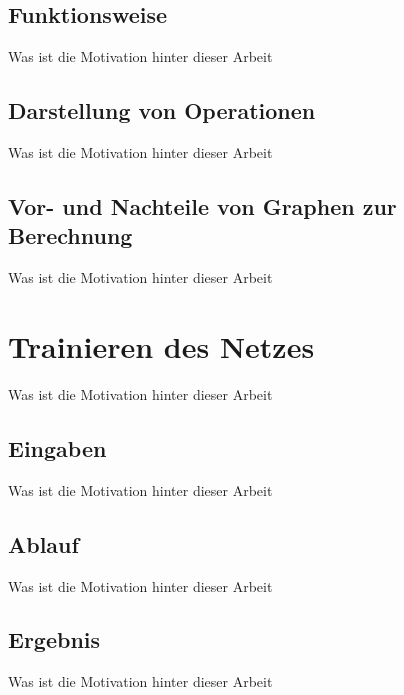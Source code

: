 \subsection{Funktionsweise}
\label{sec:graphenFunktionsweise}
Was ist die Motivation hinter dieser Arbeit

\subsection{Darstellung von Operationen}
\label{sec:darstellungOperationen}
Was ist die Motivation hinter dieser Arbeit

\subsection{Vor- und Nachteile von Graphen zur Berechnung}
\label{sec:vorUndNachteile}
Was ist die Motivation hinter dieser Arbeit

\section{Trainieren des Netzes}
\label{sec:trainierenDesNetzes}
Was ist die Motivation hinter dieser Arbeit


\subsection{Eingaben}
\label{sec:eingaben}
Was ist die Motivation hinter dieser Arbeit

\subsection{Ablauf}
\label{sec:ablauf}
Was ist die Motivation hinter dieser Arbeit

\subsection{Ergebnis}
\label{sec:ergebnis}
Was ist die Motivation hinter dieser Arbeit